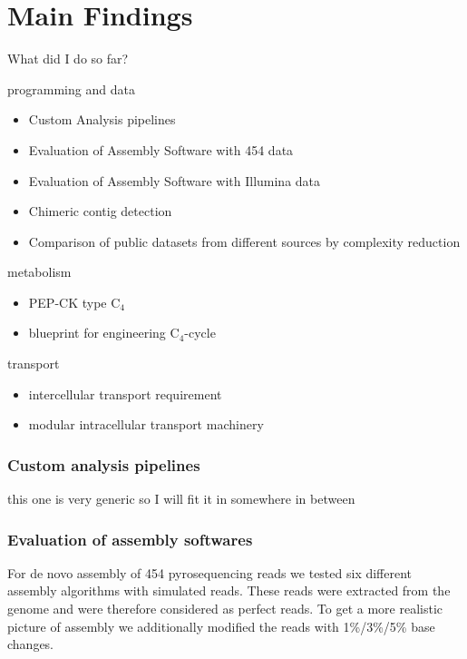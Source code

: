 \chapter{Main Findings} %

What did I do so far?

programming and data
\begin{itemize}
	\item Custom Analysis pipelines
	\item Evaluation of  Assembly Software with 454 data
	\item Evaluation of Assembly Software with Illumina data
	\item Chimeric contig detection
	\item Comparison of public datasets from different sources by complexity reduction
\end{itemize}

metabolism
\begin{itemize}
	\item {} PEP-CK type C$_4$
	\item {} blueprint for engineering C$_4$-cycle
\end{itemize}
	
transport
\begin{itemize}
	\item {} intercellular transport requirement
	\item {} modular intracellular transport machinery
\end{itemize}



\subsection{Custom analysis pipelines}
this one is very generic so I will fit it in somewhere in between
\subsection{Evaluation of assembly softwares}
For de novo assembly of 454 pyrosequencing reads we tested six different assembly algorithms with simulated reads. These reads were extracted from the  genome and were therefore considered as perfect reads. To get a more realistic picture of assembly we additionally modified the reads with 1\%/3\%/5\%  base changes.

